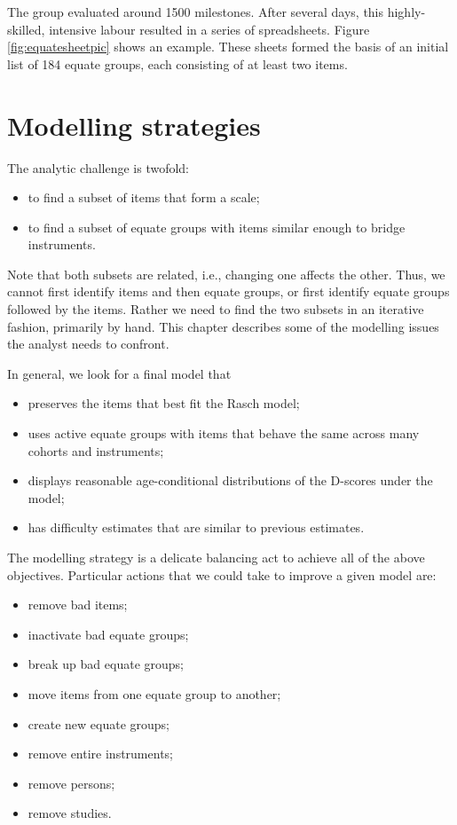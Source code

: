 \documentclass[
]{book}
\providecommand{\tightlist}{%
  \setlength{\itemsep}{0pt}\setlength{\parskip}{0pt}}
\begin{document}
The group evaluated around 1500 milestones. After several days, this highly-skilled, intensive labour resulted in a series of spreadsheets. Figure \ref{fig:equatesheetpic} shows an example. These sheets formed the basis of an initial list of 184 equate groups, each consisting of at least two items.

\hypertarget{sec:modellingstrategies}{%
\section{Modelling strategies}\label{sec:modellingstrategies}}

The analytic challenge is twofold:

\begin{itemize}
\tightlist
\item
  to find a subset of items that form a scale;
\item
  to find a subset of equate groups with items similar enough to bridge instruments.
\end{itemize}

Note that both subsets are related, i.e., changing one affects the other. Thus, we cannot first identify items and then equate groups, or first identify equate groups followed by the items. Rather we need to find the two subsets in an iterative fashion, primarily by hand. This chapter describes some of the modelling issues the analyst needs to confront.

In general, we look for a final model that

\begin{itemize}
\tightlist
\item
  preserves the items that best fit the Rasch model;
\item
  uses active equate groups with items that behave the same across many cohorts and instruments;
\item
  displays reasonable age-conditional distributions of the D-scores under the model;
\item
  has difficulty estimates that are similar to previous estimates.
\end{itemize}

The modelling strategy is a delicate balancing act to achieve all of the above objectives. Particular actions that we could take to improve a given model are:

\begin{itemize}
\tightlist
\item
  remove bad items;
\item
  inactivate bad equate groups;
\item
  break up bad equate groups;
\item
  move items from one equate group to another;
\item
  create new equate groups;
\item
  remove entire instruments;
\item
  remove persons;
\item
  remove studies.
\end{itemize}
\end{document}
